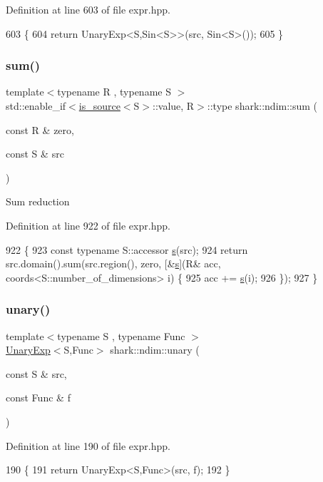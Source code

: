 Definition at line 603 of file expr.\+hpp.


\begin{DoxyCode}
603                                                                                            \{
604             \textcolor{keywordflow}{return} UnaryExp<S,Sin<S>>(src, Sin<S>());
605         \}
\end{DoxyCode}
\hypertarget{namespaceshark_1_1ndim_a864213068a08615fa12bdd67d83ed324}{}\label{namespaceshark_1_1ndim_a864213068a08615fa12bdd67d83ed324} 
\subsubsection{\texorpdfstring{sum()}{sum()}}
{\footnotesize\ttfamily template$<$typename R , typename S $>$ \\
std\+::enable\+\_\+if$<$\hyperlink{classshark_1_1ndim_1_1is__source}{is\+\_\+source}$<$S$>$\+::value, R$>$\+::type shark\+::ndim\+::sum (\begin{DoxyParamCaption}\item[{const R \&}]{zero,  }\item[{const S \&}]{src }\end{DoxyParamCaption})}

Sum reduction 

Definition at line 922 of file expr.\+hpp.


\begin{DoxyCode}
922                                                                                          \{
923             \textcolor{keyword}{const} \textcolor{keyword}{typename} S::accessor \hyperlink{classshark_1_1_group_a6c59f34c15be2873372cd006c2939da2}{s}(src);
924             \textcolor{keywordflow}{return} src.domain().sum(src.region(), zero, [&\hyperlink{classshark_1_1_group_a6c59f34c15be2873372cd006c2939da2}{s}](R& acc, coords<S::number\_of\_dimensions> i) \{
925                 acc += \hyperlink{classshark_1_1_group_a6c59f34c15be2873372cd006c2939da2}{s}(i);
926             \});
927         \}
\end{DoxyCode}
\hypertarget{namespaceshark_1_1ndim_af14b9ab4bea37d932d735ef2902cbae7}{}\label{namespaceshark_1_1ndim_af14b9ab4bea37d932d735ef2902cbae7} 
\subsubsection{\texorpdfstring{unary()}{unary()}}
{\footnotesize\ttfamily template$<$typename S , typename Func $>$ \\
\hyperlink{classshark_1_1ndim_1_1_unary_exp}{Unary\+Exp}$<$S,Func$>$ shark\+::ndim\+::unary (\begin{DoxyParamCaption}\item[{const S \&}]{src,  }\item[{const Func \&}]{f }\end{DoxyParamCaption})}



Definition at line 190 of file expr.\+hpp.


\begin{DoxyCode}
190                                                             \{
191             \textcolor{keywordflow}{return} UnaryExp<S,Func>(src, f);
192         \}
\end{DoxyCode}
